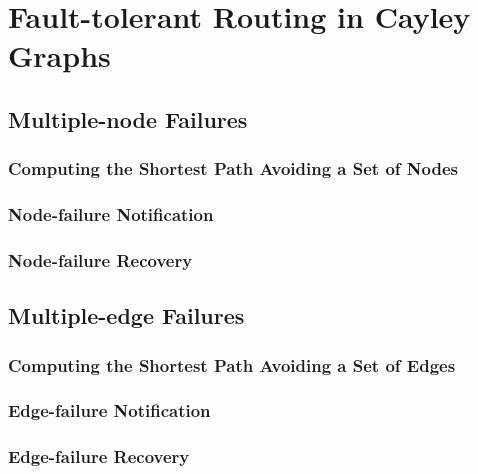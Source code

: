 
\chapter{Fault-tolerant Routing in Cayley Graphs}
\label{ch:fault_tolerant}



\ifpdf
    \graphicspath{{5_fault_tolerant/figures/PNG/}{5_fault_tolerant/figures/PDF/}{5_fault_tolerant/figures/}}
\else
    \graphicspath{{5_fault_tolerant/figures/EPS/}{5_fault_tolerant/figures/}}
\fi


\section{Multiple-node Failures}

\subsection{Computing the Shortest Path Avoiding a Set of Nodes}

\subsection{Node-failure Notification}

\subsection{Node-failure Recovery}

\section{Multiple-edge Failures}

\subsection{Computing the Shortest Path Avoiding a Set of Edges}

\subsection{Edge-failure Notification}

\subsection{Edge-failure Recovery}




